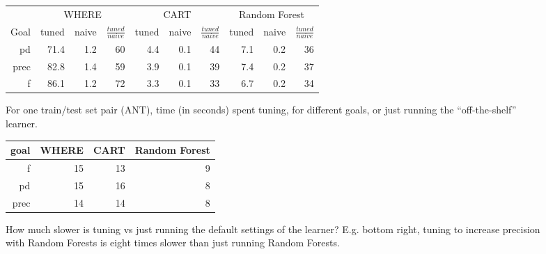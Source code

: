  
 
\begin{figure}[!t]

\renewcommand{\baselinestretch}{0.8}
\scriptsize
\centering
  \begin{tabular}{r@{~}|r@{~}rr|r@{~}rr|r@{~}rr}
    & \multicolumn{3}{c|}{WHERE}&\multicolumn{3}{c|}{CART}& \multicolumn{3}{c}{Random Forest}\\\cline{2-10} 
    Goal & tuned & naive &$\frac{\mathit{tuned}}{\mathit{naive}}$& tuned & naive &$\frac{\mathit{tuned}}{\mathit{naive}}$& tuned & naive&$\frac{\mathit{tuned}}{\mathit{naive}}$\\\hline
pd&71.4&1.2&60&4.4&0.1&44&7.1&0.2&36\\ 
prec&82.8&1.4&59&3.9&0.1&39&7.4&0.2&37\\
f&86.1&1.2&72&3.3&0.1&33&6.7&0.2&34
  \end{tabular}
  \caption{For one train/test set pair (ANT),  time (in seconds) spent tuning,
  for different goals, or just running the ``off-the-shelf'' learner.}
\end{figure}


\begin{figure}[!t]

\renewcommand{\baselinestretch}{0.8}
\scriptsize
\centering
\begin{tabular}{r|rrr}
goal &	WHERE	&CART&	Random Forest\\\hline
f	&15	&13	&9\\ 
pd	&15	&16	&8\\ 
prec&	14	&14	&8
\end{tabular}
\caption{How much slower is tuning vs just running the default
settings of the learner? E.g. bottom right, tuning to increase
precision with Random Forests is eight times slower than
just running Random Forests.}
\end{figure}



